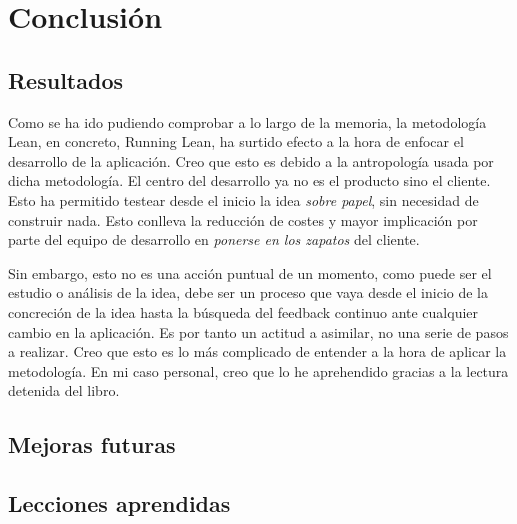 
\chapter{Conclusión}\label{conclusion}

\section{Resultados}\label{sec:resultados}

Como se ha ido pudiendo comprobar a lo largo de la memoria, la metodología Lean, en concreto, Running Lean, ha surtido efecto a la hora de enfocar el desarrollo de la aplicación. Creo que esto es debido a la antropología usada por dicha metodología. El centro del desarrollo ya no es el producto sino el cliente. Esto ha permitido testear desde el inicio la idea \textit{sobre papel}, sin necesidad de construir nada. Esto conlleva la reducción de costes y mayor implicación por parte del equipo de desarrollo en \textit{ponerse en los zapatos} del cliente.

Sin embargo, esto no es una acción puntual de un momento, como puede ser el estudio o análisis de la idea, debe ser un proceso que vaya desde el inicio de la concreción de la idea hasta la búsqueda del feedback continuo ante cualquier cambio en la aplicación. Es por tanto un actitud a asimilar, no una serie de pasos a realizar. Creo que esto es lo más complicado de entender a la hora de aplicar la metodología. En mi caso personal, creo que lo he aprehendido gracias a la lectura detenida del libro.

\section{Mejoras futuras}\label{sec:mejoras_futuras}

\section{Lecciones aprendidas}\label{sec:lecciones_aprendidas}